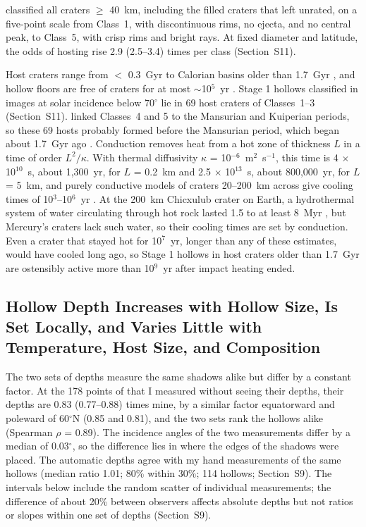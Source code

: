 \documentclass[article,review]{planetary}
\begin{document}
\textcite{kinczykMorphologicalEvaluationCrater2020} classified all craters $\geq$ 40~km, including the filled craters that \textcite{herrick2018} left unrated, on a five-point scale from Class~1, with discontinuous rims, no ejecta, and no central peak, to Class~5, with crisp rims and bright rays. At fixed diameter and latitude, the odds of hosting rise 2.9 (2.5--3.4) times per class (Section~S11).

Host craters range from $<$ 0.3~Gyr \parencite{blewett2016,banks2017} to Calorian basins older than 1.7~Gyr \parencite{blewett2013,banks2017}, and hollow floors are free of craters for at most $\sim$10$^5$~yr \parencite{wang2020}. Stage 1 hollows classified in images at solar incidence below 70$^\circ$ lie in 69 host craters of Classes~1--3 (Section~S11). \textcite{kinczykMorphologicalEvaluationCrater2020} linked Classes~4 and 5 to the Mansurian and Kuiperian periods, so these 69 hosts probably formed before the Mansurian period, which began about 1.7~Gyr ago \parencite{banks2017}. Conduction removes heat from a hot zone of thickness $L$ in a time of order $L^2/\kappa$. With thermal diffusivity $\kappa$ = 10$^{-6}$~m$^2$~s$^{-1}$, this time is 4 $\times$ 10$^{10}$~s, about 1,300~yr, for $L$ = 0.2~km and 2.5 $\times$ 10$^{13}$~s, about 800,000~yr, for $L$ = 5~km, and purely conductive models of craters 20--200~km across give cooling times of 10$^3$--10$^6$~yr \parencite[and references therein]{abramov2005}. At the 200~km Chicxulub crater on Earth, a hydrothermal system of water circulating through hot rock lasted 1.5 to at least 8~Myr \parencite{abramov2007,kring2020,pickersgill2026}, but Mercury's craters lack such water, so their cooling times are set by conduction. Even a crater that stayed hot for 10$^7$~yr, longer than any of these estimates, would have cooled long ago, so Stage 1 hollows in host craters older than 1.7~Gyr are ostensibly active more than 10$^9$~yr after impact heating ended.

\subsection{Hollow Depth Increases with Hollow Size, Is Set Locally, and Varies Little with Temperature, Host Size, and Composition}
\label{sec:depth}
The two sets of depths measure the same shadows alike but differ by a constant factor. At the 178 points of \textcite{blewett2016} that I measured without seeing their depths, their depths are 0.83 (0.77--0.88) times mine, by a similar factor equatorward and poleward of 60$^\circ$N (0.85 and 0.81), and the two sets rank the hollows alike (Spearman $\rho$ = 0.89). The incidence angles of the two measurements differ by a median of 0.03$^\circ$, so the difference lies in where the edges of the shadows were placed. The automatic depths agree with my hand measurements of the same hollows (median ratio 1.01; 80\% within 30\%; 114 hollows; Section~S9). The intervals below include the random scatter of individual measurements; the difference of about 20\% between observers affects absolute depths but not ratios or slopes within one set of depths (Section~S9).
\end{document}

